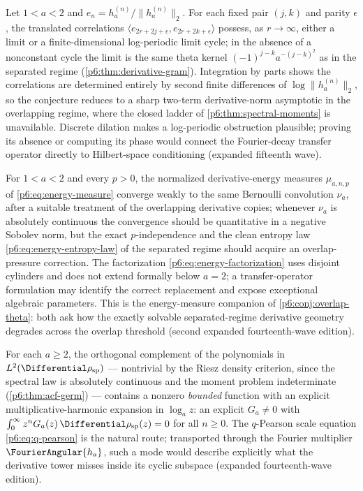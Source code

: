 \documentclass[11pt,oneside]{article}
\numberwithin{equation}{section}
\theoremstyle{definition}
\theoremstyle{remark}
\begin{document}
\begin{conjecture}
\label{p6:conj:overlap-theta}
Let $1<a<2$ and $e_n=h_a^{(n)}/\|h_a^{(n)}\|_2$.  For each fixed pair
$(j,k)$ and parity $\epsilon$, the translated correlations
$\langle e_{2r+2j+\epsilon},e_{2r+2k+\epsilon}\rangle$ possess, as
$r\to\infty$, either a limit or a finite-dimensional log-periodic limit
cycle; in the absence of a nonconstant cycle the limit is the same theta
kernel $(-1)^{j-k}a^{-(j-k)^2}$ as in the separated regime
(\cref{p6:thm:derivative-gram}).  Integration by parts shows the
correlations are determined entirely by second finite differences of
$\log\|h_a^{(n)}\|_2$, so the conjecture reduces to a sharp two-term
derivative-norm asymptotic in the overlapping regime, where the closed
ladder of \cref{p6:thm:spectral-moments} is unavailable.  Discrete dilation
makes a log-periodic obstruction plausible; proving its absence or computing
its phase would connect the Fourier-decay transfer operator directly to
Hilbert-space conditioning (expanded fifteenth wave).
\end{conjecture}

\begin{conjecture}
\label{p6:conj:overlap-energy}
For $1<a<2$ and every $p>0$, the normalized derivative-energy measures
$\mu_{a,n,p}$ of \eqref{p6:eq:energy-measure} converge weakly to the same
Bernoulli convolution $\nu_a$, after a suitable treatment of the
overlapping derivative copies; whenever $\nu_a$ is absolutely continuous
the convergence should be quantitative in a negative Sobolev norm, but the
exact $p$-independence and the clean entropy law
\eqref{p6:eq:energy-entropy-law} of the separated regime should acquire an
overlap-pressure correction.  The factorization
\eqref{p6:eq:energy-factorization} uses disjoint cylinders and does not
extend formally below $a=2$; a transfer-operator formulation may identify
the correct replacement and expose exceptional algebraic parameters.  This
is the energy-measure companion of \cref{p6:conj:overlap-theta}: both ask
how the exactly solvable separated-regime derivative geometry degrades
across the overlap threshold (second expanded fourteenth-wave edition).
\end{conjecture}

\begin{conjecture}
\label{p6:conj:spectral-null-modes}
For each $a\ge2$, the orthogonal complement of the polynomials in
$L^2(\Differential\rho_{\mathrm{sp}})$ --- nontrivial by the Riesz density criterion,
since the spectral law is absolutely continuous and the moment problem
indeterminate (\cref{p6:thm:acf-germ}) --- contains a nonzero
\emph{bounded} function with an explicit multiplicative-harmonic expansion
in $\log_az$: an explicit $G_a\ne0$ with
$\int_0^\infty z^nG_a(z)\,\Differential\rho_{\mathrm{sp}}(z)=0$ for all $n\ge0$.
The $q$-Pearson scale equation \eqref{p6:eq:q-pearson} is the natural
route; transported through the Fourier multiplier $\FourierAngular{h_a}$, such a
mode would describe explicitly what the derivative tower misses inside its
cyclic subspace (expanded fourteenth-wave edition).
\end{conjecture}
\end{document}
